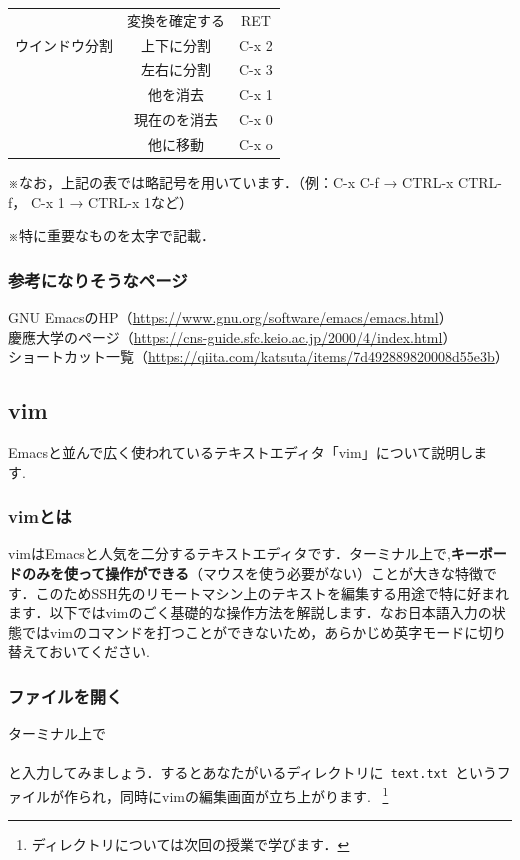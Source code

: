 \documentclass{jarticle}
\begin{document}
\begin{table}[H]
\begin{minipage}{0.5\hsize}
\begin{center}
\begin{tabular}{|c|c|c|}
                &  変換を確定する  & RET \\
ウインドウ分割 & 上下に分割 & C-x 2\\
                      & 左右に分割 & C-x 3 \\
                      & 他を消去 & C-x 1  \\
                      & 現在のを消去 & C-x 0 \\
                      & 他に移動 & C-x o \\
                      \hline
                    \end{tabular}
                  \end{center}
                  \label{table:two}
                \end{minipage}
              \end{table}
              
※なお，上記の表では略記号を用いています．（例：C-x C-f → CTRL-x CTRL-f，
C-x 1 → CTRL-x 1など）

※特に重要なものを太字で記載．


\subsubsection{参考になりそうなページ}
\noindent
GNU EmacsのHP（\url{https://www.gnu.org/software/emacs/emacs.html}） \\
慶應大学のページ（\url{https://cns-guide.sfc.keio.ac.jp/2000/4/index.html}）\\
ショートカット一覧（\url{https://qiita.com/katsuta/items/7d492889820008d55e3b}）

\subsection{vim}
Emacsと並んで広く使われているテキストエディタ「vim」について説明します.\

\subsubsection{vimとは}
vimはEmacsと人気を二分するテキストエディタです．ターミナル上で,{\bf キーボードのみを使って操作ができる}（マウスを使う必要がない）ことが大きな特徴です．このためSSH先のリモートマシン上のテキストを編集する用途で特に好まれます．以下ではvimのごく基礎的な操作方法を解説します．なお日本語入力の状態ではvimのコマンドを打つことができないため，あらかじめ英字モードに切り替えておいてください.\

\subsubsection{ファイルを開く}
ターミナル上で\ \\
\quad \quad {}\\
と入力してみましょう．するとあなたがいるディレクトリに\verb| text.txt |というファイルが作られ，同時にvimの編集画面が立ち上がります. \ \footnote{ディレクトリについては次回の授業で学びます．}
\end{document}
